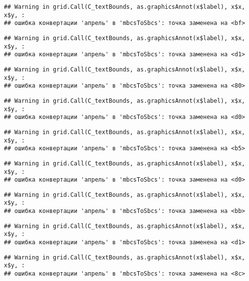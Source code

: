 \documentclass[
]{article}
\begin{document}
\begin{verbatim}
## Warning in grid.Call(C_textBounds, as.graphicsAnnot(x$label), x$x, x$y, :
## ошибка конвертации 'апрель' в 'mbcsToSbcs': точка заменена на <bf>
\end{verbatim}

\begin{verbatim}
## Warning in grid.Call(C_textBounds, as.graphicsAnnot(x$label), x$x, x$y, :
## ошибка конвертации 'апрель' в 'mbcsToSbcs': точка заменена на <d1>
\end{verbatim}

\begin{verbatim}
## Warning in grid.Call(C_textBounds, as.graphicsAnnot(x$label), x$x, x$y, :
## ошибка конвертации 'апрель' в 'mbcsToSbcs': точка заменена на <80>
\end{verbatim}

\begin{verbatim}
## Warning in grid.Call(C_textBounds, as.graphicsAnnot(x$label), x$x, x$y, :
## ошибка конвертации 'апрель' в 'mbcsToSbcs': точка заменена на <d0>
\end{verbatim}

\begin{verbatim}
## Warning in grid.Call(C_textBounds, as.graphicsAnnot(x$label), x$x, x$y, :
## ошибка конвертации 'апрель' в 'mbcsToSbcs': точка заменена на <b5>
\end{verbatim}

\begin{verbatim}
## Warning in grid.Call(C_textBounds, as.graphicsAnnot(x$label), x$x, x$y, :
## ошибка конвертации 'апрель' в 'mbcsToSbcs': точка заменена на <d0>
\end{verbatim}

\begin{verbatim}
## Warning in grid.Call(C_textBounds, as.graphicsAnnot(x$label), x$x, x$y, :
## ошибка конвертации 'апрель' в 'mbcsToSbcs': точка заменена на <bb>
\end{verbatim}

\begin{verbatim}
## Warning in grid.Call(C_textBounds, as.graphicsAnnot(x$label), x$x, x$y, :
## ошибка конвертации 'апрель' в 'mbcsToSbcs': точка заменена на <d1>
\end{verbatim}

\begin{verbatim}
## Warning in grid.Call(C_textBounds, as.graphicsAnnot(x$label), x$x, x$y, :
## ошибка конвертации 'апрель' в 'mbcsToSbcs': точка заменена на <8c>
\end{verbatim}
\end{document}
